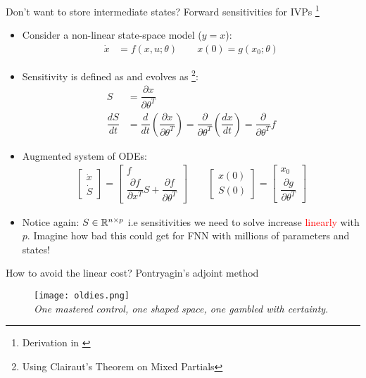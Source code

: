 \documentclass[dvipsnames, 9pt]{beamer}
\begin{document}
\begin{frame}{Don't want to store intermediate states? Forward sensitivities for IVPs \footnote{Derivation in \cite{rawlings:ekerdt:2020}}}
    \begin{itemize}
    \item Consider a non-linear state-space model ($y=x$):
    \begin{align*}
        \dot{x} &= f(x, u; \theta) \qquad x(0) = g(x_0; \theta)
    \end{align*}
    \item Sensitivity is defined as and evolves as \footnote{Using Clairaut's Theorem on Mixed Partials}:
    \begin{align*}
        S &= \dfrac{\partial x}{\partial \theta^T} \\
        \dfrac{d S}{dt} &= \dfrac{d}{dt} \left(\dfrac{\partial x}{\partial \theta^T}\right) =
        \dfrac{\partial}{\partial\theta^T} \left(\dfrac{d x}{dt}\right) = 
        \dfrac{\partial }{\partial \theta^T} f
    \end{align*}
    \item Augmented system of ODEs:
    \begin{align*}
        \begin{bmatrix} \dot{x} \\ \dot{S} \end{bmatrix} = 
        \begin{bmatrix} f \\ \dfrac{\partial f}{\partial x^T}S + \dfrac{\partial f}{\partial \theta^T} \end{bmatrix}
        \qquad
        \begin{bmatrix} x(0) \\ S(0) \end{bmatrix} =
        \begin{bmatrix} x_0 \\ \dfrac{\partial g}{\partial \theta^T} \end{bmatrix}
    \end{align*}
    \item Notice again: $S\in \mathbb{R}^{n\times p}$ i.e sensitivities we need to solve
    increase \textcolor{red}{linearly} with $p$. Imagine how bad this could get for FNN with millions of parameters and 
    states!
    \end{itemize}
\end{frame}


\begin{frame}{How to avoid the linear cost? Pontryagin's adjoint method}
    \begin{figure}
        \centering
        \texttt{[image: oldies.png]}\\
        \textit{One mastered control, one shaped space, one gambled with certainty}.\\
    \end{figure}
\end{frame}
\end{document}
